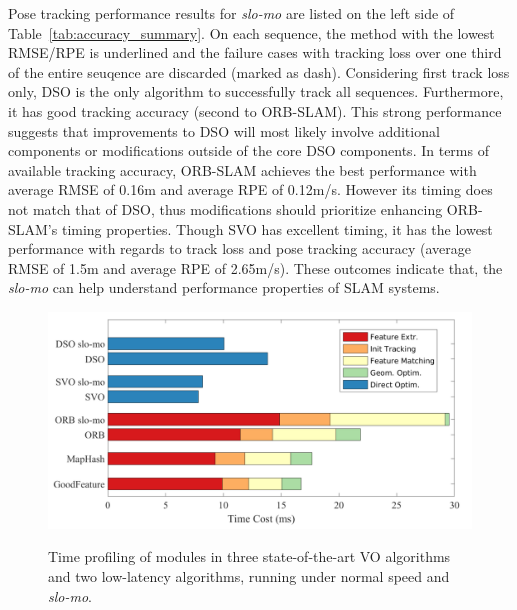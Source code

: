 Pose tracking performance results for \textit{slo-mo} are listed on 
the left side of Table~\ref{tab:accuracy_summary}. On each sequence, 
the method with the lowest RMSE/RPE is underlined and the failure cases 
with tracking loss over one third of the entire seuqence are discarded 
(marked as dash). 
Considering first track loss only, DSO is the only algorithm to
successfully track all sequences. Furthermore, it has good tracking
accuracy (second to ORB-SLAM). This strong performance suggests that
improvements to DSO will most likely involve additional components or
modifications outside of the core DSO components.
In terms of available tracking accuracy, ORB-SLAM achieves the best
performance with average RMSE of 0.16m and average RPE of 0.12m/s.  
However its timing does not match that of DSO, thus modifications should
prioritize enhancing ORB-SLAM's timing properties.
Though SVO has excellent timing, it has the lowest performance with
regards to track loss and pose tracking accuracy 
(average RMSE of 1.5m and average RPE of 2.65m/s).  
These outcomes indicate that, the \textit{slo-mo} can help understand 
performance properties of SLAM systems. 

\begin{figure}[t]
	\centering
	\includegraphics[width=\columnwidth]{./component_timecost.pdf} \\
	\caption{Time profiling of modules in three state-of-the-art VO algorithms and two low-latency algorithms, running under normal speed and \textit{slo-mo}.
 \label{fig:latency}}
\end{figure}






